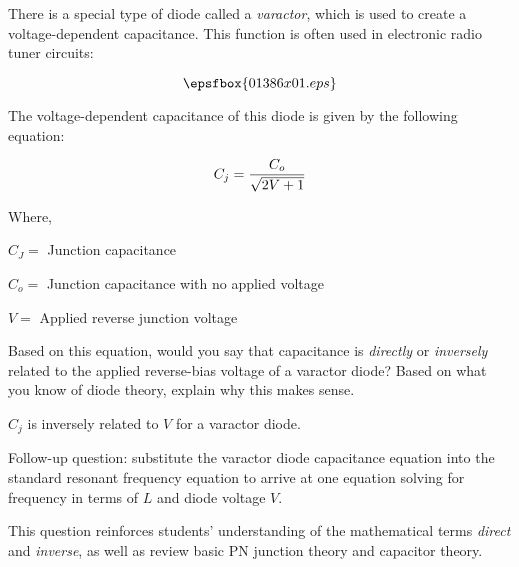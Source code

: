 

There is a special type of diode called a {\it varactor}, which is used to create a voltage-dependent capacitance.  This function is often used in electronic radio tuner circuits:

$$\epsfbox{01386x01.eps}$$

The voltage-dependent capacitance of this diode is given by the following equation:

$$C_j = {C_o \over {\sqrt{2V + 1}}}$$

\noindent
Where,

$C_J =$ Junction capacitance

$C_o =$ Junction capacitance with no applied voltage

$V = $ Applied reverse junction voltage 

\vskip 10pt

Based on this equation, would you say that capacitance is {\it directly} or {\it inversely} related to the applied reverse-bias voltage of a varactor diode?  Based on what you know of diode theory, explain why this makes sense.







$C_j$ is inversely related to $V$ for a varactor diode.

\vskip 10pt

Follow-up question: substitute the varactor diode capacitance equation into the standard resonant frequency equation to arrive at one equation solving for frequency in terms of $L$ and diode voltage $V$.







This question reinforces students' understanding of the mathematical terms {\it direct} and {\it inverse}, as well as review basic PN junction theory and capacitor theory.




